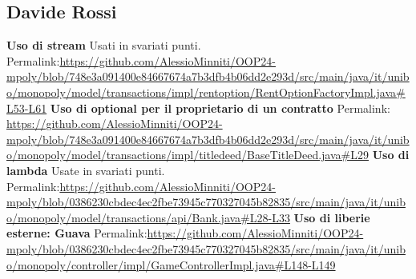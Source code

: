 \subsection{Davide Rossi}
\textbf{Uso di stream}\newline
\newline
Usati in svariati punti. Permalink:\url{https://github.com/AlessioMinniti/OOP24-mpoly/blob/748e3a091400e84667674a7b3dfb4b06dd2e293d/src/main/java/it/unibo/monopoly/model/transactions/impl/rentoption/RentOptionFactoryImpl.java#L53-L61}\newline
\newline
\textbf{Uso di optional per il proprietario di un contratto}\newline
\newline
Permalink: \url{https://github.com/AlessioMinniti/OOP24-mpoly/blob/748e3a091400e84667674a7b3dfb4b06dd2e293d/src/main/java/it/unibo/monopoly/model/transactions/impl/titledeed/BaseTitleDeed.java#L29}\newline
\newline
\textbf{Uso di lambda}\newline
\newline
Usate in svariati punti. Permalink:\url{https://github.com/AlessioMinniti/OOP24-mpoly/blob/0386230cbdec4ec2fbe73945c770327045b82835/src/main/java/it/unibo/monopoly/model/transactions/api/Bank.java#L28-L33}\newline
\newline
\textbf{Uso di liberie esterne: Guava}
Permalink:\url{https://github.com/AlessioMinniti/OOP24-mpoly/blob/0386230cbdec4ec2fbe73945c770327045b82835/src/main/java/it/unibo/monopoly/controller/impl/GameControllerImpl.java#L148-L149}\newline